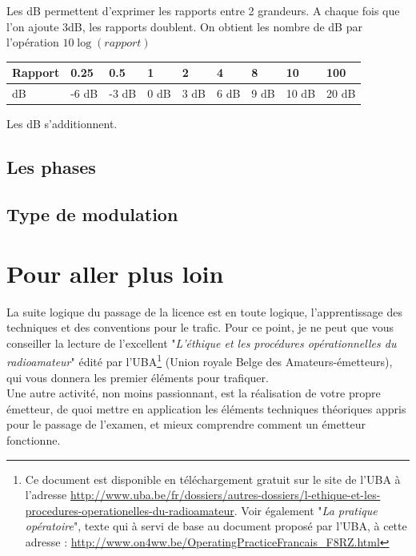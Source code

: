 \documentclass[a4paper,12pt,oneside]{report} %
\begin{document}
	Les dB permettent d'exprimer les rapports entre 2 grandeurs. A chaque fois que l'on ajoute 3dB, les rapports doublent. On obtient les nombre de dB par l'opération $10\log{(rapport)}$
	
	\begin{center}
	\begin{tabular}{|l|l|l|l|l|l|l|l|l|}
	\hline
	 Rapport &	0.25  &	0.5 &	1 &	2 &	4 & 8 &  10 & 	100 \\
	 \hline
	 dB &		-6 dB &	-3 dB & 0 dB & 3 dB & 6 dB & 9 dB & 10 dB & 	20 dB \\
	\hline	
	\end{tabular}
	\end{center}
	
	Les dB s'additionnent.
	
	\section{Les phases}
	
	
	
	\section{Type de modulation}
	
	
\chapter{Pour aller plus loin}
	La suite logique du passage de la licence est en toute logique, l'apprentissage des techniques et des conventions pour le trafic. Pour ce point, je ne peut que vous conseiller la lecture de l'excellent "\textit{L'éthique et les procédures opérationnelles du radioamateur}" édité par l'UBA\footnote{Ce document est disponible en téléchargement gratuit sur le site de l'UBA à l'adresse \url{http://www.uba.be/fr/dossiers/autres-dossiers/l-ethique-et-les-procedures-operationelles-du-radioamateur}. Voir également "\textit{La pratique opératoire}", texte qui à servi de base au document proposé par l'UBA, à cette adresse : \url{http://www.on4ww.be/OperatingPracticeFrancais_F8RZ.html}} (Union royale Belge des Amateurs-émetteurs), qui vous donnera les premier éléments pour trafiquer. \\
	
	Une autre activité, non moins passionnant, est la réalisation de votre propre émetteur, de quoi mettre en application les éléments techniques théoriques appris pour le passage de l'examen, et mieux comprendre comment un émetteur fonctionne. \\
\end{document}
